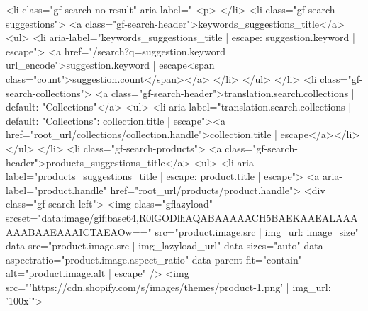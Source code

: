 {{{{{{{{{{{{{{{{{{{{{{{{{{{{{{{{{{{{{{{{{{{{{{{{{{{{{{{{{{{{{{{{{{{{{{%
  {%
    <li class="gf-search-no-result" aria-label="{%
      <p>{%
    </li>
  {%
    {%
    <li class="gf-search-suggestions">
      <a class="gf-search-header">{{keywords_suggestions_title}}</a>
      <ul>
        {%
          <li aria-label="{{keywords_suggestions_title | escape}}: {{suggestion.keyword | escape}}">
            <a href="/search?q={{suggestion.keyword | url_encode}}">{{suggestion.keyword | escape}}<span class="count">{{suggestion.count}}</span></a>
          </li>
        {%
      </ul>
    </li>
  {%
      {%
    <li class="gf-search-collections">
      <a class="gf-search-header">{{translation.search.collections | default: "Collections"}}</a>
      <ul>
        {%
          <li aria-label="{{translation.search.collections | default: "Collections"}}: {{collection.title | escape}}"><a href="{{root_url}}/collections/{{collection.handle}}">{{collection.title | escape}}</a></li>
        {%
      </ul>
    </li>
  {%
      {%
    <li class="gf-search-products">
      <a class="gf-search-header">{{products_suggestions_title}}</a>
      <ul>
        {%
          <li aria-label="{{products_suggestions_title | escape}}: {{product.title | escape}}">
            <a aria-label="{{product.handle}}" href="{{root_url}}/products/{{product.handle}}">
              <div class="gf-search-left">
                {%
                <img 
                  class="gflazyload"
                  srcset="data:image/gif;base64,R0lGODlhAQABAAAAACH5BAEKAAEALAAAAAABAAEAAAICTAEAOw=="
                  src="{{product.image.src | img_url: image_size}}"
                  data-src="{{product.image.src | img_lazyload_url}}"
                  data-sizes="auto"
                  data-aspectratio="{{product.image.aspect_ratio}}"
                  data-parent-fit="contain"
                  alt="{{product.image.alt | escape}}"
                />
                {%
                <img src="{{'https://cdn.shopify.com/s/images/themes/product-1.png' | img_url: '100x'}}">
}}}}}}}}}}}}}}}}}}}}}}}}}}}}}}}}}}}}}}}}}}}}}}}}}}}}}}}}}}}}}}}}}}}}}}}}}}}}}}}}}}}}}}
